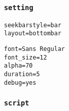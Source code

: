 \documentclass[11pt]{article}
\begin{document}
\subsubsection{\texttt{setting}}
\label{sec:org4319c6b}

\lstset{language=bash,label= ,caption= ,captionpos=b,numbers=none}
\begin{lstlisting}
seekbarstyle=bar
layout=bottombar
\end{lstlisting}

\lstset{language=bash,label= ,caption= ,captionpos=b,numbers=none}
\begin{lstlisting}
font=Sans Regular
font_size=12
alpha=70
duration=5
debug=yes
\end{lstlisting}

\subsubsection{\texttt{script}}
\label{sec:orgb018353}
\end{document}
